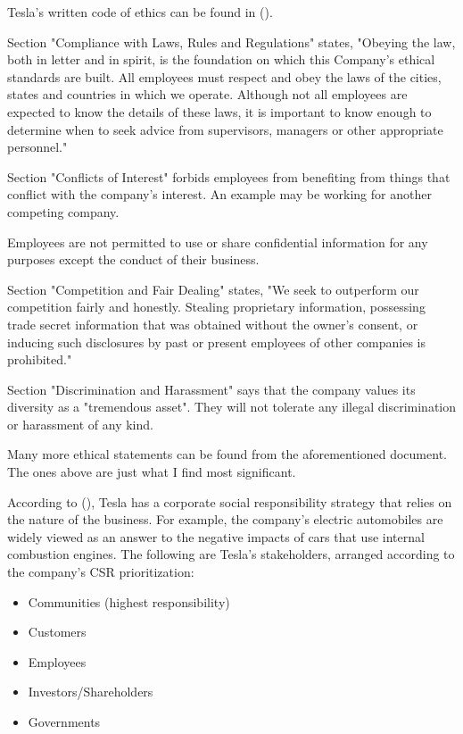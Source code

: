 \documentclass[12pt]{article}
\begin{document}
Tesla's written code of ethics can be found in (\cite{te10}).

Section "Compliance with Laws, Rules and Regulations" states, "Obeying the law, both in letter and in spirit, is the foundation on which this Company's ethical standards are built. All employees must respect and obey the laws of the cities, states and countries in which we operate. Although not all employees are expected to know the details of these laws, it is important to know enough to determine when to seek advice from supervisors, managers or other appropriate personnel."

Section "Conflicts of Interest" forbids employees from benefiting from things that conflict with the company's interest. An example may be working for another competing company.

Employees are not permitted to use or share confidential information for any purposes except the conduct of their business.

Section "Competition and Fair Dealing" states, "We seek to outperform our competition fairly and honestly. Stealing proprietary information, possessing trade secret information that was obtained without the owner's consent, or inducing such disclosures by past or present employees of other companies is prohibited."

Section "Discrimination and Harassment" says that the company values its diversity as a "tremendous asset". They will not tolerate any illegal discrimination or harassment of any kind.

Many more ethical statements can be found from the aforementioned document. The ones above are just what I find most significant.

According to (\cite{gr17}), Tesla has a corporate social responsibility strategy that relies on the nature of the business. For example, the company’s electric automobiles are widely viewed as an answer to the negative impacts of cars that use internal combustion engines. The following are Tesla’s stakeholders, arranged according to the company’s CSR prioritization:

\begin{itemize}
	\item{Communities (highest responsibility)}
	\item{Customers}
	\item{Employees}
	\item{Investors/Shareholders}
	\item{Governments}
\end{itemize}
\end{document}

